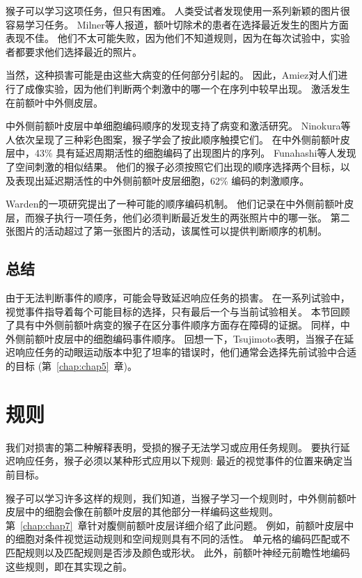 猴子可以学习这项任务，但只有困难。
人类受试者发现使用一系列新颖的图片很容易学习任务。
Milner等人\cite{milner1985frontal}报道，额叶切除术的患者在选择最近发生的图片方面表现不佳。
他们不太可能失败，因为他们不知道规则，因为在每次试验中，实验者都要求他们选择最近的照片。


当然，这种损害可能是由这些大病变的任何部分引起的。
因此，Amiez\cite{amiez2007selective}对人们进行了成像实验，因为他们判断两个刺激中的哪一个在序列中较早出现。
激活发生在前额叶中外侧皮层。


中外侧前额叶皮层中单细胞编码顺序的发现支持了病变和激活研究。
Ninokura等人\cite{ninokura2003representation}依次呈现了三种彩色图案，猴子学会了按此顺序触摸它们。
在中外侧前额叶皮层中，43\% 具有延迟周期活性的细胞编码了出现图片的序列。
Funahashi等人\cite{funahashi1997delay}发现了空间刺激的相似结果。
他们的猴子必须按照它们出现的顺序选择两个目标，以及表现出延迟期活性的中外侧前额叶皮层细胞，62\% 编码的刺激顺序。


Warden\cite{warden2007representation}的一项研究提出了一种可能的顺序编码机制。
他们记录在中外侧前额叶皮层，而猴子执行一项任务，他们必须判断最近发生的两张照片中的哪一张。
第二张图片的活动超过了第一张图片的活动，该属性可以提供判断顺序的机制。



\subsection{总结}

由于无法判断事件的顺序，可能会导致延迟响应任务的损害。
在一系列试验中，视觉事件指导着每个可能目标的选择，只有最后一个与当前试验相关。
本节回顾了具有中外侧前额叶病变的猴子在区分事件顺序方面存在障碍的证据。
同样，中外侧前额叶皮层中的细胞编码事件顺序。
回想一下，Tsujimoto\cite{tsujimoto2012prefrontal}表明，当猴子在延迟响应任务的动眼运动版本中犯了坦率的错误时，他们通常会选择先前试验中合适的目标 (第~\ref{chap:chap5}~章)。



\section{规则}

我们对损害的第二种解释表明，受损的猴子无法学习或应用任务规则。
要执行延迟响应任务，猴子必须以某种形式应用以下规则: 最近的视觉事件的位置来确定当前目标。


猴子可以学习许多这样的规则，我们知道，当猴子学习一个规则时，中外侧前额叶皮层中的细胞会像在前额叶皮层的其他部分一样编码这些规则。
第~\ref{chap:chap7}~章针对腹侧前额叶皮层详细介绍了此问题。
例如，前额叶皮层中的细胞对条件视觉运动规则和空间规则\cite{wise1999role}具有不同的活性。
单元格的编码匹配或不匹配规则\cite{wallis2001single}以及匹配规则是否涉及颜色或形状\cite{mansouri2006prefrontal}。
此外，前额叶神经元前瞻性地编码这些规则，即在其实现之前\cite{wallis2001single}。


